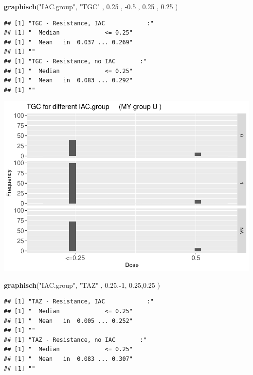 \documentclass[
]{article}
\newenvironment{Shaded}{\begin{snugshade}}{\end{snugshade}}
\newcommand{\DecValTok}[1]{\textcolor[rgb]{0.00,0.00,0.81}{#1}}
\newcommand{\FloatTok}[1]{\textcolor[rgb]{0.00,0.00,0.81}{#1}}
\newcommand{\KeywordTok}[1]{\textcolor[rgb]{0.13,0.29,0.53}{\textbf{#1}}}
\newcommand{\NormalTok}[1]{#1}
\newcommand{\OperatorTok}[1]{\textcolor[rgb]{0.81,0.36,0.00}{\textbf{#1}}}
\newcommand{\StringTok}[1]{\textcolor[rgb]{0.31,0.60,0.02}{#1}}
\begin{document}
\begin{Shaded}
\begin{Highlighting}[]
   \KeywordTok{graphisch}\NormalTok{(}\StringTok{"IAC.group"}\NormalTok{, }\StringTok{"TGC"}\NormalTok{ , }\FloatTok{0.25}\NormalTok{ ,  }\FloatTok{-0.5}\NormalTok{ ,   }\FloatTok{0.25}\NormalTok{ ,   }\FloatTok{0.25}\NormalTok{ )  }
\end{Highlighting}
\end{Shaded}

\begin{verbatim}
## [1] "TGC - Resistance, IAC            :"
## [1] "  Median             <= 0.25"
## [1] "  Mean   in  0.037 ... 0.269"
## [1] ""
## [1] "TGC - Resistance, no IAC       :"
## [1] "  Median             <= 0.25"
## [1] "  Mean   in  0.083 ... 0.292"
## [1] ""
\end{verbatim}

\includegraphics{Verteilungen_files/figure-latex/unnamed-chunk-10-1.pdf}

\begin{Shaded}
\begin{Highlighting}[]
   \KeywordTok{graphisch}\NormalTok{(}\StringTok{"IAC.group"}\NormalTok{, }\StringTok{"TAZ"}\NormalTok{ , }\FloatTok{0.25}\NormalTok{,}\OperatorTok{-}\DecValTok{1}\NormalTok{,   }\FloatTok{0.25}\NormalTok{,}\FloatTok{0.25}\NormalTok{ )  }
\end{Highlighting}
\end{Shaded}

\begin{verbatim}
## [1] "TAZ - Resistance, IAC            :"
## [1] "  Median             <= 0.25"
## [1] "  Mean   in  0.005 ... 0.252"
## [1] ""
## [1] "TAZ - Resistance, no IAC       :"
## [1] "  Median             <= 0.25"
## [1] "  Mean   in  0.083 ... 0.307"
## [1] ""
\end{verbatim}
\end{document}
